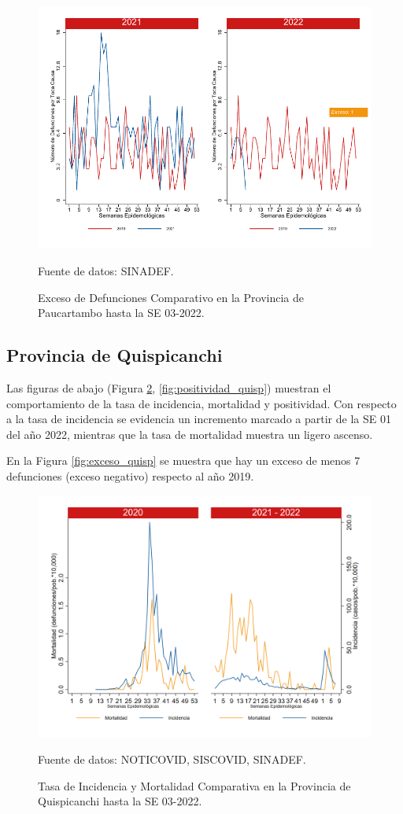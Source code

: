 \documentclass[12pt,a4paper,openany]{book}
\begin{document}
		\begin{figure}[h]
			\caption{Exceso de Defunciones Comparativo en la Provincia de Paucartambo hasta la SE 03-2022.}\label{fig:exceso_paucartam}
			\begin{center}
				\includegraphics[width=0.7\linewidth]{../figuras/exceso_11.pdf}
			\end{center}
			{\footnotesize {Fuente de datos: SINADEF.}}
		\end{figure}
		
		\clearpage
		
		\subsection*{Provincia de Quispicanchi}
		\noindent Las figuras de abajo (Figura \ref{fig:inc_mort_quisp}, \ref{fig:positividad_quisp}) muestran el comportamiento de la tasa de incidencia, mortalidad y positividad. Con respecto a la tasa de incidencia se evidencia un incremento marcado a partir de la SE 01 del año 2022, mientras que la tasa de mortalidad muestra un ligero ascenso.   

		
	En la Figura \ref{fig:exceso_quisp} se muestra que hay un exceso de menos 7 defunciones (exceso negativo) respecto al año 2019.
		
		\begin{figure}[h]
			\caption{Tasa de Incidencia y Mortalidad Comparativa en la Provincia de Quispicanchi hasta la SE 03-2022.}\label{fig:inc_mort_quisp}
			\begin{center}
				\includegraphics[width=0.7\linewidth]{../figuras/incidencia_mortalidad_20_21_12.png}
			\end{center}
			{\footnotesize {Fuente de datos: NOTICOVID, SISCOVID, SINADEF.}}
		\end{figure}
		
\end{document}
